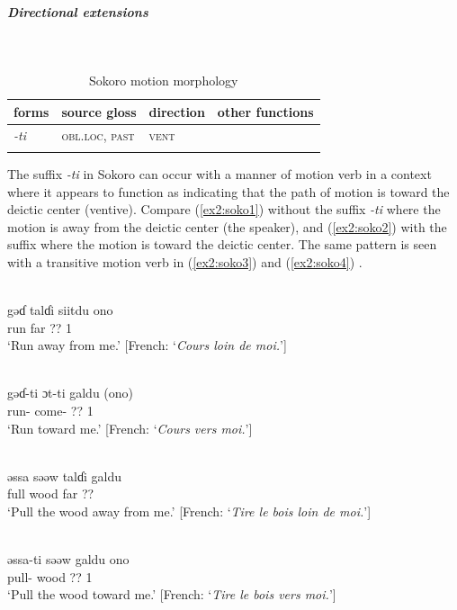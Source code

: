 \subparagraph{Directional extensions}~

\begin{table}[H]
	\caption{Sokoro motion morphology}
	\label{tab:soko}
	\begin{tabular}{llll} %
		\lsptoprule
		forms & source gloss &  direction  & other functions  \\ %
		\midrule
		\textit{-ti}  &  \textsc{obl.loc}, \textsc{past}   & \textsc{vent}  &   \\
		\lspbottomrule
	\end{tabular}
\end{table}

The suffix \textit{-ti} in Sokoro can occur with a manner of motion verb in a context where it appears to function as indicating that the path of motion is toward the deictic center (ventive). Compare (\ref{ex2:soko1}) without the suffix \textit{-ti} where the motion is away from the deictic center (the speaker), and (\ref{ex2:soko2})  with the suffix where the motion is toward the deictic center. The same pattern is seen with a transitive motion verb in (\ref{ex2:soko3}) and (\ref{ex2:soko4}) .

\ea\label{ex2:soko1}
 \\
\gll gəɗ	talɗi	siitdu	ono \\
run	far	??	1 \\
\glt `Run away from me.' [French: `\textit{Cours loin de moi.}']

\ex\label{ex2:soko2}
 \\
\gll gəɗ-ti	ɔt-ti	galdu	(ono) \\
run-	come-	??	1	 \\
\glt `Run toward me.' [French: `\textit{Cours vers moi.}']

\ex\label{ex2:soko3}
 \\
\gll əssa	səəw	talɗi	galdu \\
full	wood	far	?? \\
\glt `Pull the wood away from me.' [French: `\textit{Tire le bois loin de moi.}']

\ex\label{ex2:soko4}
 \\
\gll əssa-ti	səəw	galdu	ono \\
pull-	wood	??	1 \\
\glt `Pull the wood toward me.' [French: `\textit{Tire le bois vers moi.}']
\z 

